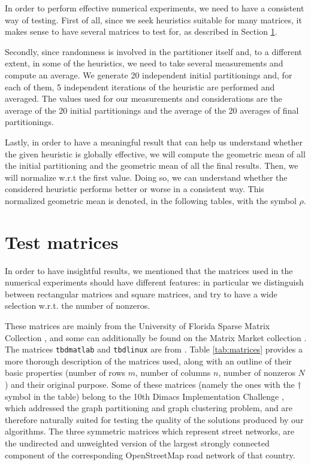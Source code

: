 In order to perform effective numerical experiments, we need to have a consistent way of testing. First of all, since we seek heuristics suitable for many matrices, it makes sense to have several matrices to test for, as described in Section \ref{sec:test_matrices}. 

Secondly, since randomness is involved in the partitioner itself and, to a different extent, in some of the heuristics, we need to take several measurements and compute an average. We generate 20 independent initial partitionings and, for each of them, 5 independent iterations of the heuristic are performed and averaged. The values used for our measurements and considerations are the average of the 20 initial partitionings and the average of the 20 averages of final partitionings.

Lastly, in order to have a meaningful result that can help us understand whether the given heuristic is globally effective, we will compute the geometric mean of all the initial partitioning and the geometric mean of all the final results. Then, we will normalize w.r.t the first value. Doing so, we can understand whether the considered heuristic performs better or worse in a consistent way. This normalized geometric mean is denoted, in the following tables, with the symbol $\rho$.

\section{Test matrices} \label{sec:test_matrices}

In order to have insightful results, we mentioned that the matrices used in the numerical experiments should have different features: in particular we distinguish between rectangular matrices and square matrices, and try to have a wide selection w.r.t. the number of nonzeros. 

These matrices are mainly from the University of Florida Sparse Matrix Collection \cite{ufl}, and some can additionally be found on the Matrix Market collection \cite{matrixmarket}. The matrices \verb|tbdmatlab| and \verb|tbdlinux| are from \cite{mondriaan}. Table \ref{tab:matrices} provides a more thorough description of the matrices used, along with an outline of their basic properties (number of rows $m$, number of columns $n$, number of nonzeros $N$) and their original purpose. Some of these matrices (namely the ones with the $\dagger$ symbol in the table) belong to the 10th Dimacs Implementation Challenge \cite{dimacs}, which addressed the graph partitioning and graph clustering problem, and are therefore naturally suited for testing the quality of the solutions produced by our algorithms. The three symmetric matrices which represent street networks, are the undirected and unweighted version of the largest strongly connected component of the corresponding OpenStreetMap road network of that country.


